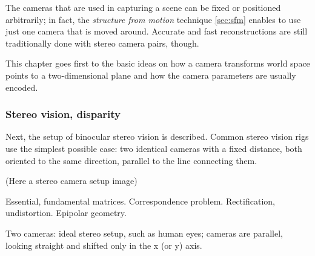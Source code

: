 The cameras that are used in capturing a scene can be fixed or positioned arbitrarily; in fact, the \textit{structure from motion} technique \ref{sec:sfm} enables to use just one camera that is moved around. Accurate and fast reconstructions are still traditionally done with stereo camera pairs, though.

This chapter goes first to the basic ideas on how a camera transforms world space points to a two-dimensional plane and how the camera parameters are usually encoded.


\subsubsection{Stereo vision, disparity}

Next, the setup of binocular stereo vision is described. Common stereo vision rigs use the simplest possible case: two identical cameras with a fixed distance, both oriented to the same direction, parallel to the line connecting them.

(Here a stereo camera setup image)

Essential, fundamental matrices. Correspondence problem. Rectification, undistortion. Epipolar geometry.

Two cameras: ideal stereo setup, such as human eyes; cameras are parallel, looking straight and shifted only in the x (or y) axis.

